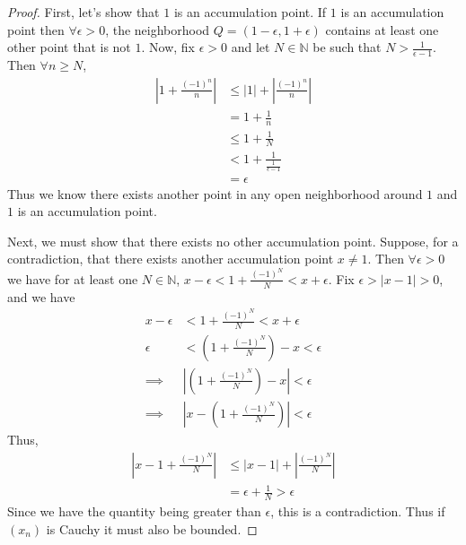 \documentclass[leqno]{article}
\theoremstyle{nonumberplain}
\newtheorem{proof}{Proof}
\begin{document}
\begin{proof}
First, let's show that $1$ is an accumulation point.  If $1$ is an accumulation point then $\forall \epsilon>0$, the neighborhood $Q=(1-\epsilon,1+\epsilon)$ contains at least one other point that is not $1$. Now, fix $\epsilon>0$ and let $N\in \mathbb{N}$ be such that $N> \frac{1}{\epsilon-1}$. Then $\forall n\geq N$,
\begin{align*}
\left| 1+ \frac{(-1)^n}{n}\right|&\leq |1|+\left|\frac{(-1)^n}{n}\right|\\
&= 1+\frac{1}{n}\\
&\leq 1 + \frac{1}{N}\\
&< 1 + \frac{1}{\frac{1}{\epsilon-1}}\\
&=\epsilon
\end{align*}
Thus we know there exists another point in any open neighborhood around $1$ and $1$ is an accumulation point.

Next, we must show that there exists no other accumulation point.  Suppose, for a contradiction, that there exists another accumulation point $x\neq 1$. Then $\forall \epsilon >0$ we have for at least one $N \in \mathbb{N}$, $x-\epsilon < 1 + \frac{(-1)^N}{N} < x+\epsilon$. Fix $\epsilon>|x-1|>0$, and we have  
\begin{align*}
x-\epsilon &< 1 + \frac{(-1)^N}{N} < x+\epsilon\\
\epsilon &< \left(1 + \frac{(-1)^N}{N}\right) -x< \epsilon\\
\implies &\left|\left(1+\frac{(-1)^N}{N}\right)-x\right|<\epsilon\\
\implies &\left|x-\left(1+\frac{(-1)^N}{N}\right)\right|<\epsilon
\end{align*}
Thus,
\begin{align*}
\left|x-1+\frac{(-1)^N}{N}\right|&\leq |x-1|+\left|\frac{(-1)^N}{N}\right|\\
&=\epsilon + \frac{1}{N}>\epsilon
\end{align*}
Since we have the quantity being greater than $\epsilon$, this is a contradiction.  Thus if $(x_n)$ is Cauchy it must also be bounded.
\end{proof}

\pagebreak


\end{document}
